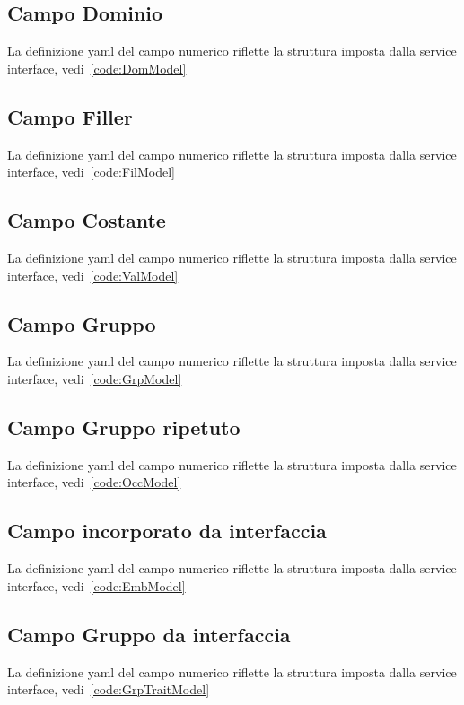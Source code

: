 \documentclass[a4paper,10pt]{report}
\begin{document}
\subsection{Campo Dominio}
La definizione yaml del campo numerico riflette la struttura imposta dalla
service interface, vedi~\ref{code:DomModel}

\subsection{Campo Filler}
La definizione yaml del campo numerico riflette la struttura imposta dalla
service interface, vedi~\ref{code:FilModel}

\subsection{Campo Costante}
La definizione yaml del campo numerico riflette la struttura imposta dalla
service interface, vedi~\ref{code:ValModel}

\subsection{Campo Gruppo}
La definizione yaml del campo numerico riflette la struttura imposta dalla
service interface, vedi~\ref{code:GrpModel}

\subsection{Campo Gruppo ripetuto}
La definizione yaml del campo numerico riflette la struttura imposta dalla
service interface, vedi~\ref{code:OccModel}

\subsection{Campo incorporato da interfaccia}
La definizione yaml del campo numerico riflette la struttura imposta dalla
service interface, vedi~\ref{code:EmbModel}

\subsection{Campo Gruppo da interfaccia}
La definizione yaml del campo numerico riflette la struttura imposta dalla
service interface, vedi~\ref{code:GrpTraitModel}
\end{document}
